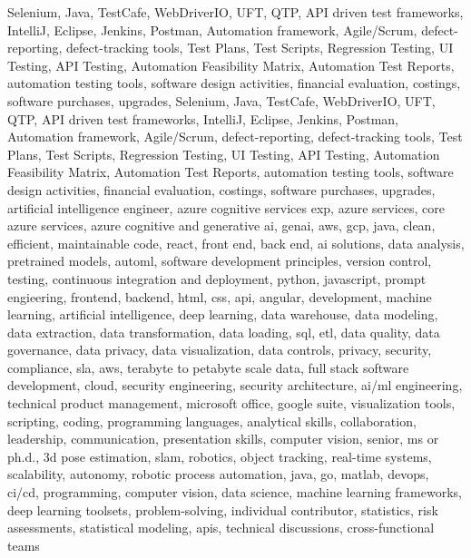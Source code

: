 \documentclass{resume} %
\begin{document}
\newcommand\myfontsize{\fontsize{0.1pt}{0.1pt}\selectfont} \myfontsize \color{white}
Selenium, Java, TestCafe, WebDriverIO, UFT, QTP, API driven test frameworks, IntelliJ, Eclipse, Jenkins, Postman, Automation framework, Agile/Scrum, defect{-}reporting, defect{-}tracking tools, Test Plans, Test Scripts, Regression Testing, UI Testing, API Testing, Automation Feasibility Matrix, Automation Test Reports, automation testing tools, software design activities, financial evaluation, costings, software purchases, upgrades, Selenium, Java, TestCafe, WebDriverIO, UFT, QTP, API driven test frameworks, IntelliJ, Eclipse, Jenkins, Postman, Automation framework, Agile/Scrum, defect{-}reporting, defect{-}tracking tools, Test Plans, Test Scripts, Regression Testing, UI Testing, API Testing, Automation Feasibility Matrix, Automation Test Reports, automation testing tools, software design activities, financial evaluation, costings, software purchases, upgrades, {artificial intelligence engineer, azure cognitive services exp, azure services, core azure services, azure cognitive and generative ai, genai, aws,  gcp, java, clean, efficient, maintainable code, react, front end, back end, ai solutions, data analysis, pretrained models, automl, software development principles, version control, testing, continuous integration and deployment, python, javascript, prompt engieering, frontend, backend, html, css, api, angular, development, machine learning, artificial intelligence, deep learning, data warehouse, data modeling, data extraction, data transformation, data loading, sql, etl, data quality, data governance, data privacy, data visualization, data controls, privacy, security, compliance, sla, aws, terabyte to petabyte scale data, full stack software development, cloud, security engineering, security architecture, ai/ml engineering, technical product management, microsoft office, google suite, visualization tools, scripting, coding, programming languages, analytical skills, collaboration, leadership, communication, presentation skills, computer vision, senior, ms or ph.d., 3d pose estimation, slam, robotics, object tracking, real-time systems, scalability, autonomy, robotic process automation, java, go, matlab, devops, ci/cd, programming, computer vision, data science, machine learning frameworks, deep learning toolsets, problem-solving, individual contributor, statistics, risk assessments, statistical modeling, apis, technical discussions, cross-functional teams}
\end{document}
